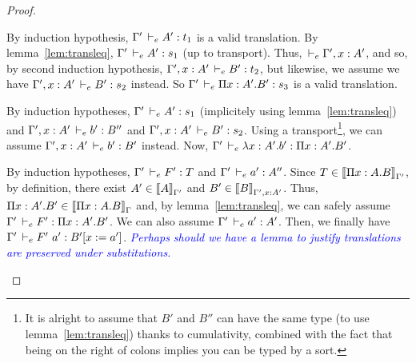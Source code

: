 \documentclass[a4paper,english]{lipics-utf8x}
\newcommand\meta[1]{\noindent\textcolor{blue}{\emph{#1}}}
\begin{document}
\begin{proof}
\begin{caselist}
      \begin{graycase}
        \begin{mathc}
        \end{mathc}
        By induction hypothesis, $\Gamma' \,\vdash_e A' : t_1$ is a valid
        translation.
        By lemma~\ref{lem:transleq}, $\Gamma' \,\vdash_e A' : s_1$ (up to transport).
        Thus, $\,\vdash_e \Gamma', x : A'$, and so, by second induction hypothesis,
        $\Gamma', x:A' \,\vdash_e B' : t_2$, but likewise, we assume we have
        $\Gamma', x:A' \,\vdash_e B' : s_2$ instead.
        So $\Gamma' \,\vdash_e \Pi x:A'.B' : s_3$ is a valid translation.
      \end{graycase}

      \begin{graycase}
        \begin{mathc}
        \end{mathc}
        By induction hypotheses, $\Gamma' \,\vdash_e A' : s_1$ (implicitely using
        lemma~\ref{lem:transleq}) and $\Gamma', x:A' \,\vdash_e b' : B''$ and
        $\Gamma', x:A' \,\vdash_e B' : s_2$.
        Using a transport\footnote{It is alright to assume that $B'$ and $B''$
        can have the same type (to use lemma~\ref{lem:transleq})
        thanks to cumulativity, combined with the fact that being on the right
        of colons implies you can be typed by a sort.},
        we can assume $\Gamma', x:A' \,\vdash_e b' : B'$ instead.
        Now, $\Gamma' \,\vdash_e \lambda x:A'.b' : \Pi x:A'.B'$.
      \end{graycase}

      \nextcase
      \begin{mathc}
      \end{mathc}
      By induction hypotheses, $\Gamma' \,\vdash_e F' : T$ and
      $\Gamma' \,\vdash_e a' : A''$.
      Since $T \in \mathopen{{[\kern-0.14em[}} \Pi x:A.B \mathclose{{]\kern-0.14em]}}_{\Gamma'}$, by definition, there exist
      $A' \in \mathopen{{[\kern-0.14em[}} A \mathclose{{]\kern-0.14em]}}_{\Gamma'}$ and $B' \in \mathopen{{[\kern-0.14em[}} B \mathclose{{]\kern-0.14em]}}_{\Gamma', x:A'}$.
      Thus, $\Pi x:A'.B' \in \mathopen{{[\kern-0.14em[}} \Pi x:A.B \mathclose{{]\kern-0.14em]}}_{\Gamma}$ and, by
      lemma~\ref{lem:transleq}, we can safely assume
      $\Gamma' \,\vdash_e F' : \Pi x:A'.B'$. We can also assume
      $\Gamma' \,\vdash_e a' : A'$.
      Then, we finally have $\Gamma' \,\vdash_e F'\ a' : B'[x := a']$.
      \meta{Perhaps should we have a lemma to justify translations are
      preserved under substitutions.}


\end{caselist}
\end{proof}
\end{document}
